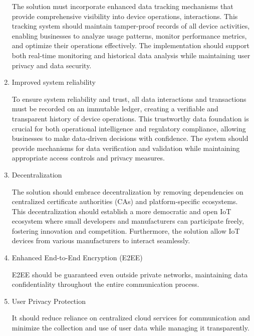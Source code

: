 \documentclass[conference]{IEEEtran}
\begin{document}
\begin{enumerate}[itemsep=2ex, parsep=1ex]
	      The solution must incorporate enhanced data tracking mechanisms that
	      provide comprehensive visibility into device operations, interactions.
	      This tracking system should maintain tamper-proof records of all device
	      activities, enabling businesses to analyze usage patterns, monitor
	      performance metrics, and optimize their operations effectively. The
	      implementation should support both real-time monitoring and historical
	      data analysis while maintaining user privacy and data security.
	      	      
	\item Improved system reliability
	      	      
	      To ensure system reliability and trust, all data interactions and transactions
	      must be recorded on an immutable ledger, creating a verifiable and
	      transparent history of device operations. This trustworthy data foundation
	      is crucial for both operational intelligence and regulatory compliance,
	      allowing businesses to make data-driven decisions with confidence. The system
	      should provide mechanisms for data verification and validation while maintaining
	      appropriate access controls and privacy measures.
	      	      
	\item Decentralization
	      	      
	      The solution should embrace decentralization by removing dependencies on
	      centralized certificate authorities (CAs) and platform-specific ecosystems.
	      This decentralization should establish a more democratic and open IoT ecosystem
	      where small developers and manufacturers can participate freely, fostering
	      innovation and competition. Furthermore, the solution allow IoT devices
	      from various manufacturers to interact seamlessly.
	      	      
	\item Enhanced End-to-End Encryption (E2EE)
	      	      
	      E2EE should be guaranteed even outside private networks, maintaining data confidentiality
	      throughout the entire communication process.
	      	      
	\item User Privacy Protection
	      	      
	      It should reduce reliance on centralized cloud services for communication
	      and minimize the collection and use of user data while managing it
	      transparently.
	      	      

\end{enumerate}
\end{document}
